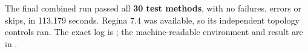 The final combined run passed all \textbf{30 test methods}, with no failures, errors or skips, in 113.179 seconds. Regina 7.4 was available, so its independent topology controls ran. The exact log is ; the machine-readable environment and result are in .
